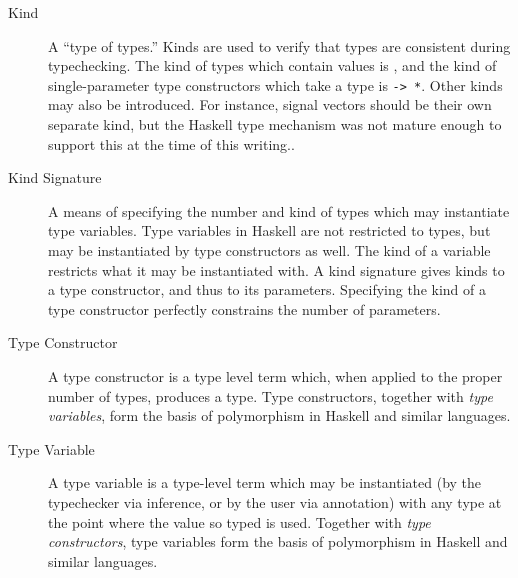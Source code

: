 \begin{description}
\item[Kind] A ``type of types.'' Kinds are used to verify that types are
consistent during typechecking. The kind of types which contain values is
{\tt *}, and the kind of single-parameter type constructors which take a
type is {\tt * -> *}. Other kinds may also be introduced. For instance,
signal vectors should be their own separate kind, but the Haskell type mechanism
was not mature enough to support this at the time of this writing..

\item[Kind Signature] A means of specifying the number and kind of types which
may instantiate type variables. Type variables in Haskell are not restricted to
types, but may be instantiated by type constructors as well. The kind of a
variable restricts what it may be instantiated with. A kind signature gives
kinds to a type constructor, and thus to its parameters. Specifying the kind
of a type constructor perfectly constrains the number of parameters.

\item[Type Constructor] A type constructor is a type level term which, when
applied to the proper number of types, produces a type. Type constructors,
together with {\em type variables}, form the basis of polymorphism in Haskell
and similar languages.

\item[Type Variable] A type variable is a type-level term which may be 
instantiated (by the typechecker via inference, or by the user via annotation)
with any type at the point where the value so typed is used. 
Together with {\em type constructors}, type variables form the basis of
polymorphism in Haskell and similar languages.
\end{description}
